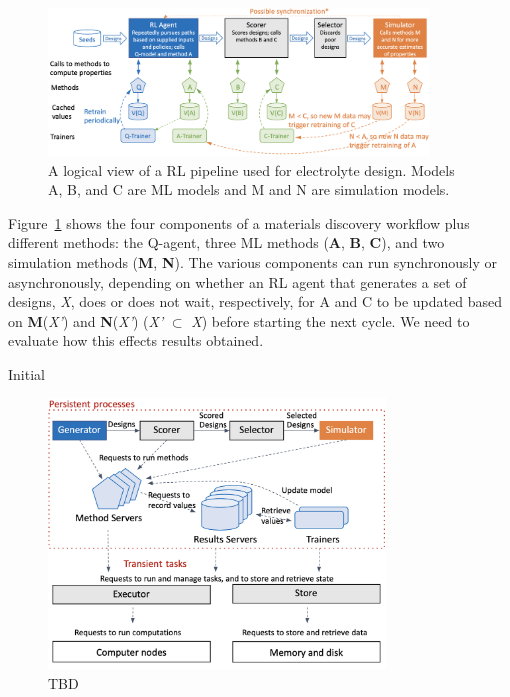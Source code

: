 \documentclass[10pt]{article}
\begin{document}
\begin{figure}
  \centering
  \includegraphics[width=0.9\textwidth,trim=0in 0in 0in 0in,clip]{./Figs/sketch.png}
  \vspace{-1.5ex}
  \caption{A logical view of a RL pipeline used for electrolyte design. Models A, B, and C are ML models and M and N are simulation models.}
\label{fig:sketch}
\end{figure}

Figure~\ref{fig:sketch} shows the four components of a materials discovery workflow plus different methods: 
the Q-agent, three ML methods (\textbf{A}, \textbf{B}, \textbf{C}), and two simulation methods (\textbf{M}, \textbf{N}).
The various components can run synchronously or asynchronously, depending on whether an RL agent that generates a set of designs, \emph{X}, does or does not wait, respectively, for A and C to be updated based on \textbf{M}(\emph{X’}) and \textbf{N}(\emph{X’}) (\emph{X’} $\subset$ \emph{X})  before starting the next cycle. We need to evaluate how this effects results obtained.

Initial 


\begin{figure}
  \centering
  \includegraphics[width=0.8\textwidth,trim=0in 0in 0in 0in,clip]{./Figs/arch.png}
  \vspace{-1.5ex}
  \caption{TBD}
\label{fig:arch}
\end{figure}
\end{document}
